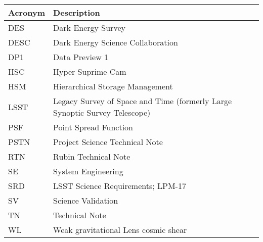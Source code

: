 \addtocounter{table}{-1}
\begin{longtable}{p{}p{}}\hline
\textbf{Acronym} & \textbf{Description}  \\\hline

DES & Dark Energy Survey \\\hline
DESC & Dark Energy Science Collaboration \\\hline
DP1 & Data Preview 1 \\\hline
HSC & Hyper Suprime-Cam \\\hline
HSM & Hierarchical Storage Management \\\hline
LSST & Legacy Survey of Space and Time (formerly Large Synoptic Survey Telescope) \\\hline
PSF & Point Spread Function \\\hline
PSTN & Project Science Technical Note \\\hline
RTN & Rubin Technical Note \\\hline
SE & System Engineering \\\hline
SRD & LSST Science Requirements; LPM-17 \\\hline
SV & Science Validation \\\hline
TN & Technical Note \\\hline
WL & Weak gravitational Lens cosmic shear \\\hline
\end{longtable}
